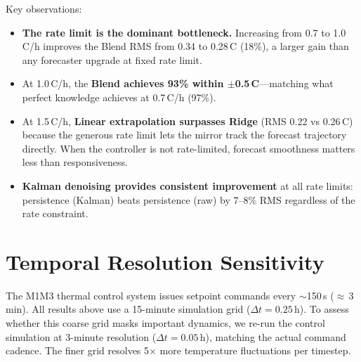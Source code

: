 \documentclass[11pt]{article}
\begin{document}
Key observations:
\begin{itemize}
  \item \textbf{The rate limit is the dominant bottleneck.}  Increasing from
    0.7 to 1.0\,\textdegree C/h improves the Blend RMS from 0.34 to
    0.28\,\textdegree C (18\%), a larger gain than any forecaster upgrade at
    fixed rate limit.
  \item At 1.0\,\textdegree C/h, the \textbf{Blend achieves 93\% within
    $\pm$0.5\,\textdegree C}---matching what perfect knowledge achieves at
    0.7\,\textdegree C/h (97\%).
  \item At 1.5\,\textdegree C/h, \textbf{Linear extrapolation surpasses
    Ridge} (RMS 0.22 vs 0.26\,\textdegree C) because the generous rate limit
    lets the mirror track the forecast trajectory directly.  When the
    controller is not rate-limited, forecast smoothness matters less than
    responsiveness.
  \item \textbf{Kalman denoising provides consistent improvement} at all rate
    limits: persistence (Kalman) beats persistence (raw) by 7--8\% RMS
    regardless of the rate constraint.
\end{itemize}

\section{Temporal Resolution Sensitivity}
\label{sec:temporal}

The M1M3 thermal control system issues setpoint commands every $\sim$150\,s
($\approx$\,3\,min).  All results above use a 15-minute simulation grid
($\Delta t = 0.25$\,h).  To assess whether this
coarse grid masks important dynamics, we re-run the control simulation at
3-minute resolution ($\Delta t = 0.05$\,h), matching the actual command cadence.
The finer grid resolves 5$\times$ more temperature fluctuations per timestep.
\end{document}
